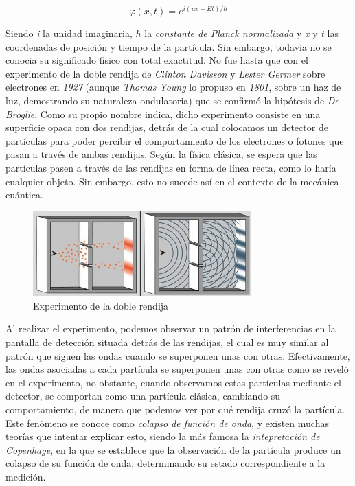 \documentclass{article}
\begin{document}
    \begin{equation}
        \varphi (x, t) = e^{i(px - Et) / \hbar}
        \label{eq: funcion_de_onda}
    \end{equation}

    \vspace{5mm}

    Siendo \textit{i} la unidad imaginaria, \( \hbar \) la \textit{constante de Planck normalizada} y \textit{x} y \textit{t} las coordenadas de posición y tiempo de la partícula. Sin embargo, todavia no se conocia su significado fisico con total exactitud. No fue hasta que con el experimento de la doble rendija de \textit{Clinton Davisson} y \textit{Lester Germer} sobre electrones en \textit{1927} (aunque \textit{Thomas Young} lo propuso en \textit{1801}, sobre un haz de luz, demostrando su naturaleza ondulatoria) que se confirmó la hipótesis de \textit{De Broglie}. Como su propio nombre indica, dicho experimento consiste en una superficie opaca con dos rendijas, detrás de la cual colocamos un detector de partículas para poder percibir el comportamiento de los electrones o fotones que pasan a través de ambas rendijas. Según la física clásica, se espera que las partículas pasen a través de las rendijas en forma de línea recta, como lo haría cualquier objeto. Sin embargo, esto no sucede así en el contexto de la mecánica cuántica.

    \vspace{5mm}

    \begin{figure}[h]
        \centering
        \includegraphics[width=0.75\textwidth]{img/Introduccion/doble_rendija.png}
        \caption{Experimento de la doble rendija}
        \label{fig: doble_rendija}
    \end{figure}

    \vspace{5mm}

    Al realizar el experimento, podemos observar un patrón de interferencias en la pantalla de detección situada detrás de las rendijas, el cual es muy similar al patrón que siguen las ondas cuando se superponen unas con otras. Efectivamente, las ondas asociadas a cada partícula se superponen unas con otras como se reveló en el experimento, no obstante, cuando observamos estas partículas mediante el detector, se comportan como una partícula clásica, cambiando su comportamiento, de manera que podemos ver por qué rendija cruzó la partícula. Este fenómeno se conoce como \textit{colapso de función de onda}, y existen muchas teorías que intentar explicar esto, siendo la más famosa la \textit{intepretación de Copenhage}, en la que se establece que la observación de la partícula produce un colapso de su función de onda, determinando su estado correspondiente a la medición.
\end{document}
